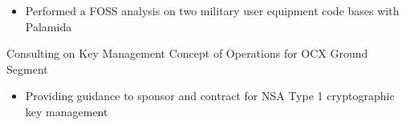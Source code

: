 \documentclass[letterpaper]{clinton-resume}
\begin{document}
\begin{minipage}[t]{0.66\textwidth}
\begin{tightitemize}
\begin{itemize}
		\item Performed a FOSS analysis on two military user equipment code bases with Palamida
	\end{itemize}
	\item Consulting on Key Management Concept of Operations for OCX Ground Segment
	\begin{itemize}
		\item Providing guidance to sponsor and contract for NSA Type 1 cryptographic key management
	\end{itemize}
\end{tightitemize}


\end{minipage}
\end{document}
